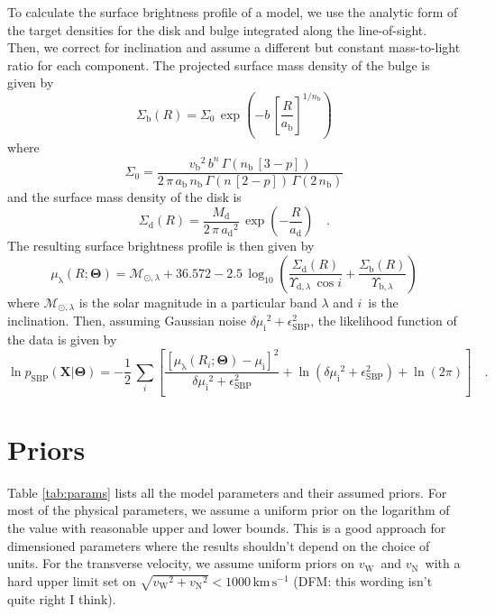 \documentclass[preprint,12pt]{aastex}
\newcommand{\Tab}[1]{Table \ref{tab:#1}}
\newcommand{\eqlabel}[1]{\label{eq:#1}}
\newcommand{\sectlabel}[1]{\label{sect:#1}}
\newcommand{\bvec}[1]{\ensuremath{\boldsymbol{#1}}}
\renewcommand{\vector}[1]{\ensuremath{\bvec{#1}}}
\newcommand{\model}{\vector{\Theta}}
\newcommand{\data}{\vector{X}}
\newcommand{\prob}{\ensuremath{p}}
\newcommand{\pr}{\prob}
\newcommand{\unit}[1]{\,\mathrm{#1}}
\newcommand{\bulge}{\mathrm{b}}
\newcommand{\disk}{\mathrm{d}}
\newcommand{\sbp}{\mathrm{SBP}}
\newcommand{\mass}{\ensuremath{M}}
\newcommand{\Md}{\ensuremath{\mass_\disk}}
\newcommand{\Rd}{\ensuremath{a_\disk}}
\newcommand{\vb}{\ensuremath{v_\bulge}}
\newcommand{\Rb}{\ensuremath{a_\bulge}}
\newcommand{\nb}{\ensuremath{n_\bulge}}
\newcommand{\jitter}[1]{\ensuremath{\epsilon_\mathrm{#1}^2}}
\newcommand{\jittersbp}{\jitter{SBP}}
\newcommand{\mtol}[1]{\ensuremath{\Upsilon_{#1}}}
\newcommand{\incl}{\ensuremath{i}}
\newcommand{\sbmu}[1]{\ensuremath{\mu_\mathrm{#1}}}
\newcommand{\sbpvar}{\ensuremath{\delta \sbmu{i}^2 + \jittersbp}}
\newcommand{\sbpobs}{\ensuremath{\sbmu{i}}}
\newcommand{\vw}{\ensuremath{v_\mathrm{W}}}
\newcommand{\vn}{\ensuremath{v_\mathrm{N}}}
\begin{document}
To calculate the surface brightness profile of a model, we use the analytic
form of the target densities for the disk and bulge integrated along the
line-of-sight. Then, we correct for inclination and assume a different but
constant mass-to-light ratio for each component. The projected surface mass
density of the bulge is given by
\begin{equation}
    \Sigma_\bulge (R) = \Sigma_0 \, \exp \left ( -b\,\left [
        \frac{R}{\Rb}
    \right ]^{1/\nb}\right )
\end{equation}
where
\begin{equation}
    \Sigma_0 = \frac{\vb^2\,b^n\,\Gamma (\nb\,[3-p])}{2\,\pi\,
        \Rb\,\nb\,\Gamma(n\,[2-p])\,\Gamma (2\,\nb)}
\end{equation}
\citep{Terzic:2005} and the surface mass density of the disk is
\begin{equation}
    \Sigma_\disk (R) = \frac{\Md}{2\,\pi\,\Rd^2} \, \exp \left (
        -\frac{R}{\Rd} \right ) \quad .
\end{equation}
The resulting surface brightness profile is then given by
\begin{equation}
    \sbmu{\lambda} (R; \model) = \mathcal{M}_{\odot,\lambda} + 36.572 -
        2.5\,\log_{10} \left (
            \frac{\Sigma_\disk (R)}{\mtol{\disk,\lambda}\,\cos \incl}
            + \frac{\Sigma_\bulge (R)}{\mtol{\bulge,\lambda}}
        \right )
\end{equation}
where $\mathcal{M}_{\odot,\lambda}$ is the solar magnitude in a particular
band $\lambda$ and \incl\ is the inclination.
Then, assuming Gaussian noise \sbpvar, the likelihood function of the data
is given by
\begin{equation}
    \eqlabel{sbplike}
    \ln \pr_\sbp (\data | \model) = - \frac{1}{2} \, \sum_i
        \left [ \frac{[ \sbmu{\lambda} (R_i; \model) - \sbpobs]^2}{\sbpvar}
            + \ln (\sbpvar) + \ln (2 \pi) \right ] \quad .
\end{equation}

\section{Priors}\sectlabel{priors}

\Tab{params} lists all the model parameters and their assumed priors. For
most of the physical parameters, we assume a uniform prior on the logarithm
of the value with reasonable upper and lower bounds. This is a good approach
for dimensioned parameters where the results shouldn't depend on the choice
of units. For the transverse velocity,
we assume uniform priors on \vw\ and \vn\ with a hard upper limit set on
$\sqrt{\vw^2 + \vn^2} < 1000\unit{km\,s^{-1}}$ (DFM: this wording isn't
quite right I think).
\end{document}
